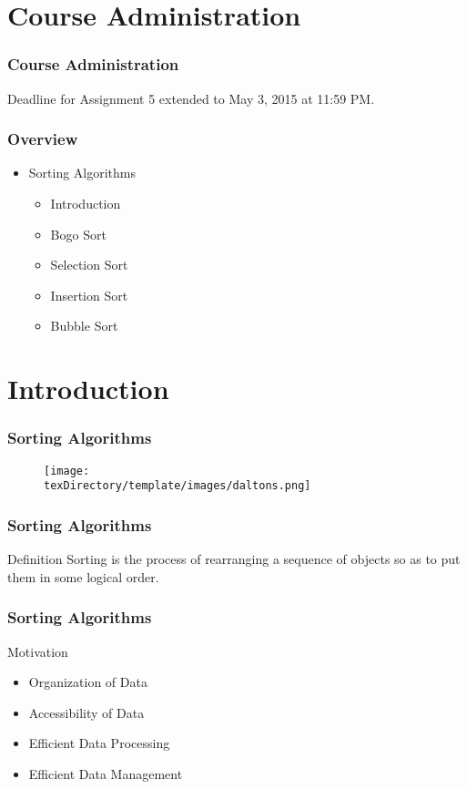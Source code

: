 \documentclass[10pt, compress]{beamer}
\begin{document}
\prepareCover

\section{Course Administration}

\begin{frame}[fragile]
\frametitle{Course Administration}
Deadline for Assignment 5 extended to May 3, 2015 at 11:59 PM.
\end{frame}

\begin{frame}[fragile]
	\frametitle{Overview}
	\begin{itemize}
		\item[] Sorting Algorithms
		\begin{itemize}
			\item[] Introduction
			\item[] Bogo Sort
			\item[] Selection Sort
			\item[] Insertion Sort
			\item[] Bubble Sort
		\end{itemize}
	\end{itemize}
\end{frame}


\section{Introduction}

\begin{frame}[fragile]
	\frametitle{Sorting Algorithms}
	\begin{figure}
		\texttt{[image: \\texDirectory/template/images/daltons.png]}
	\end{figure}
\end{frame}

\begin{frame}[fragile]
	\frametitle{Sorting Algorithms}
	\begin{block}{Definition}
		Sorting is the process of rearranging a sequence of objects so as to put them in some logical order.
	\end{block}
\end{frame}

\begin{frame}[fragile]
	\frametitle{Sorting Algorithms}
	\begin{block}{Motivation}
		\begin{itemize}
			\item[] Organization of Data
			\item[] Accessibility of Data
			\item[] Efficient Data Processing
			\item[] Efficient Data Management
		\end{itemize}
	\end{block}
\end{frame}
\end{document}
